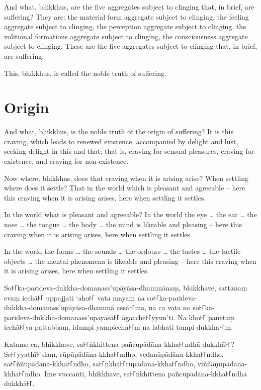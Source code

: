 And what, bhikkhus, are the five aggregates subject to clinging that, in brief,
are suffering? They are: the material form aggregate subject to clinging, the
feeling aggregate subject to clinging, the perception aggregate subject to
clinging, the volitional formations aggregate subject to clinging, the
consciousness aggregate subject to clinging. These are the five aggregates
subject to clinging that, in brief, are suffering.

This, bhikkhus, is called the noble truth of suffering.

\section{Origin}

And what, bhikkhus, is the noble truth of the origin of suffering? It is this
craving, which leads to renewed existence, accompanied by delight and lust,
seeking delight in this and that; that is, craving for sensual pleasures,
craving for existence, and craving for non-existence.

Now where, bhikkhus, does that craving when it is arising arise? When settling
where does it settle? That in the world which is pleasant and agreeable -- here
this craving when it is arising arises, here when settling it settles.

In the world what is pleasant and agreeable? In the world the eye \ldots{} the
ear \ldots{} the nose \ldots{} the tongue \ldots{} the body \ldots{} the mind is
likeable and pleasing -- here this craving when it is arising arises, here when
settling it settles.

In the world the forms \ldots{} the sounds \ldots{} the ordours \ldots{} the
tastes \ldots{} the tactile objects \ldots{} the mental phenomena is likeable
and pleasing -- here this craving when it is arising arises, here when settling
it settles.

\paliPage

So꜔꜒ka-parideva-dukkha-domanass'upāyāsa-dhammānaṃ, bhikkhave, sattānaṃ evaṃ icchā꜔꜒
uppajjati ‘aho꜔꜒ vata mayaṃ na so꜔꜒ka-parideva-\\
dukkha-domanass'upāyāsa-dhammā assā꜔꜒ma, na ca vata no so꜔꜒ka-\\
parideva-dukkha-domanass'upāyāsā꜔꜒ āgacche꜔꜒yyun’ti. Na kho꜔꜒ panetaṃ icchā꜔꜒ya
pattabbaṃ, idampi yampiccha꜔꜒ṃ na labhati tampi dukkha꜔꜒ṃ.

Katame ca, bhikkhave, sa꜔꜒ṅkhittena pañcupādāna-kkha꜔꜒ndhā dukkhā꜔꜒? Se꜔꜒yyathī꜔꜒daṃ,
rūpūpādāna-kkha꜔꜒ndho, vedanūpādāna-kkha꜔꜒ndho, sa꜔꜒ññūpādāna-kkha꜔꜒ndho,
sa꜔꜒ṅkhā꜔꜒rūpādāna-kkha꜔꜒ndho, viññāṇūpādāna-kkha꜔꜒ndho. Ime vuccanti, bhikkhave,
sa꜔꜒ṅkhittena pañcupādāna-kkha꜔꜒ndhā dukkhā꜔꜒.

